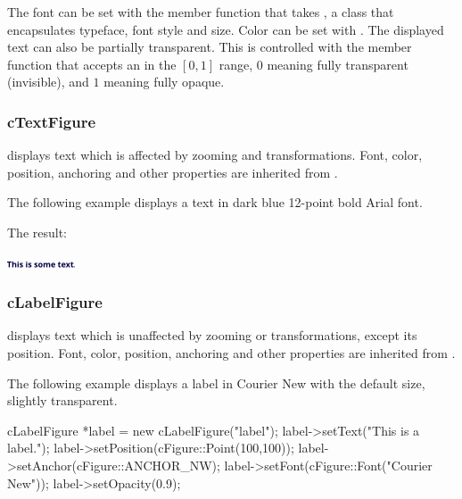 The font can be set with the  member function that takes
, a class that encapsulates typeface, font style and
size. Color can be set with . The displayed text can
also be partially transparent. This is controlled with the 
member function that accepts an  in the $[0,1]$ range, $0$ meaning
fully transparent (invisible), and $1$ meaning fully opaque.


\subsubsection{cTextFigure}

 displays text which is affected by zooming and
transformations. Font, color, position, anchoring and other properties are
inherited from .

The following example displays a text in dark blue 12-point bold Arial
font.



The result:

\begin{center}
\includegraphics[scale=4.0]{figures/figure-text}
\end{center}


\subsubsection{cLabelFigure}

 displays text which is unaffected by zooming or
transformations, except its position. Font, color, position, anchoring and
other properties are inherited from .

The following example displays a label in Courier New with the default
size, slightly transparent.

\begin{cpp}
cLabelFigure *label = new cLabelFigure("label");
label->setText("This is a label.");
label->setPosition(cFigure::Point(100,100));
label->setAnchor(cFigure::ANCHOR_NW);
label->setFont(cFigure::Font("Courier New"));
label->setOpacity(0.9);
\end{cpp}

